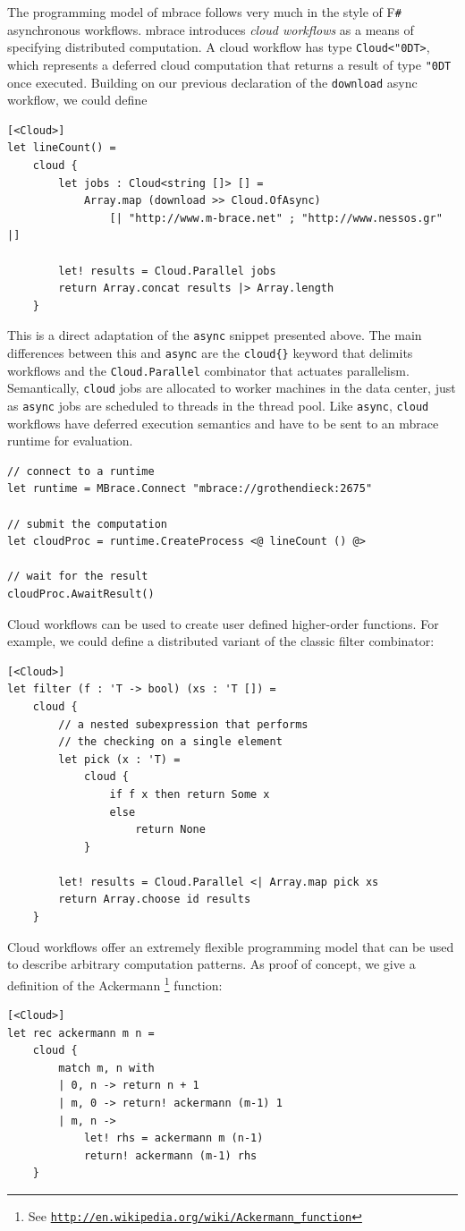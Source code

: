 \documentclass[9pt,a4paper]{article}
\newcommand{\mbrace}{mbrace}
\newcommand{\Mbrace}{\mbrace}
\newcommand{\fsharp}{F\texttt \#}
\newcommand{\samehref}[1]{\href{#1}{\texttt{#1}}}
\newcommand{\uq}{\char"0D}
\begin{document}
The programming model of \mbrace{} follows very much in the style of \fsharp{} 
asynchronous workflows. \Mbrace{} introduces \emph{cloud workflows}
as a means of specifying distributed computation.
A cloud workflow has type \texttt{Cloud<\uq{}T>}, which represents a
deferred cloud computation that returns a result of type \texttt{\uq{}T} once executed.
Building on our previous declaration of the \texttt{download} async workflow, we could define
\begin{lstlisting}
[<Cloud>]
let lineCount() = 
    cloud {
        let jobs : Cloud<string []> [] = 
            Array.map (download >> Cloud.OfAsync) 
                [| "http://www.m-brace.net" ; "http://www.nessos.gr" |]

        let! results = Cloud.Parallel jobs
        return Array.concat results |> Array.length
    }
\end{lstlisting}
This is a direct adaptation of the \texttt{async} snippet presented above.
The main differences between this and \texttt{async} 
are the \texttt{cloud\{\}} keyword that delimits workflows
and the \texttt{Cloud.Parallel} combinator that actuates parallelism.
Semantically, \texttt{cloud} jobs are allocated to worker machines in the data center, 
just as \texttt{async} jobs are scheduled to threads in the thread pool. 
Like \texttt{async}, \texttt{cloud} workflows have deferred execution semantics 
and have to be sent to an \mbrace{} runtime for evaluation.
\begin{lstlisting}
// connect to a runtime
let runtime = MBrace.Connect "mbrace://grothendieck:2675"

// submit the computation
let cloudProc = runtime.CreateProcess <@ lineCount () @>

// wait for the result
cloudProc.AwaitResult()
\end{lstlisting}
%
%
Cloud workflows can be used to create user defined higher-order functions. 
For example, we could define a distributed variant of the classic filter combinator:
\begin{lstlisting}
[<Cloud>]
let filter (f : 'T -> bool) (xs : 'T []) =
    cloud {
        // a nested subexpression that performs
        // the checking on a single element
        let pick (x : 'T) =
            cloud {
                if f x then return Some x
                else
                    return None
            }

        let! results = Cloud.Parallel <| Array.map pick xs
        return Array.choose id results
    }
\end{lstlisting}
%
%
Cloud workflows offer an extremely flexible programming model that can
be used to describe arbitrary computation patterns.
As proof of concept, we give a definition of the Ackermann%
\footnote{See \samehref{http://en.wikipedia.org/wiki/Ackermann\_function}} function:
\begin{lstlisting}
[<Cloud>]
let rec ackermann m n =
    cloud {
        match m, n with
        | 0, n -> return n + 1
        | m, 0 -> return! ackermann (m-1) 1
        | m, n ->
            let! rhs = ackermann m (n-1)
            return! ackermann (m-1) rhs
    }
\end{lstlisting}
%
\end{document}

